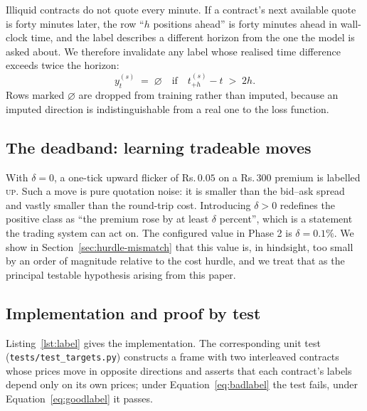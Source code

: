 \documentclass[11pt,a4paper]{article}
\newcommand{\rs}{Rs.\,}                 %
\newcommand{\code}[1]{\texttt{#1}}
\begin{document}
Illiquid contracts do not quote every minute. If a contract's next available quote is
forty minutes later, the row ``$h$ positions ahead'' is forty minutes ahead in
wall-clock time, and the label describes a different horizon from the one the model is
asked about. We therefore invalidate any label whose realised time difference exceeds
twice the horizon:
\begin{equation}
y^{(s)}_t \;=\; \varnothing \quad\text{if}\quad
t^{(s)}_{+h} - t \;>\; 2h .
\end{equation}
Rows marked $\varnothing$ are dropped from training rather than imputed, because an
imputed direction is indistinguishable from a real one to the loss function.

\subsection{The deadband: learning tradeable moves}

With $\delta=0$, a one-tick upward flicker of \rs$0.05$ on a \rs$300$ premium is labelled
\textsc{up}. Such a move is pure quotation noise: it is smaller than the bid--ask spread
and vastly smaller than the round-trip cost. Introducing $\delta>0$ redefines the
positive class as ``the premium rose by at least $\delta$ percent'', which is a statement
the trading system can act on. The configured value in Phase 2 is $\delta = 0.1\%$. We
show in Section~\ref{sec:hurdle-mismatch} that this value is, in hindsight, too small by
an order of magnitude relative to the cost hurdle, and we treat that as the principal
testable hypothesis arising from this paper.

\subsection{Implementation and proof by test}

Listing~\ref{lst:label} gives the implementation. The corresponding unit test
(\code{tests/test\_targets.py}) constructs a frame with two interleaved contracts whose
prices move in opposite directions and asserts that each contract's labels depend only
on its own prices; under Equation~\eqref{eq:badlabel} the test fails, under
Equation~\eqref{eq:goodlabel} it passes.
\end{document}

